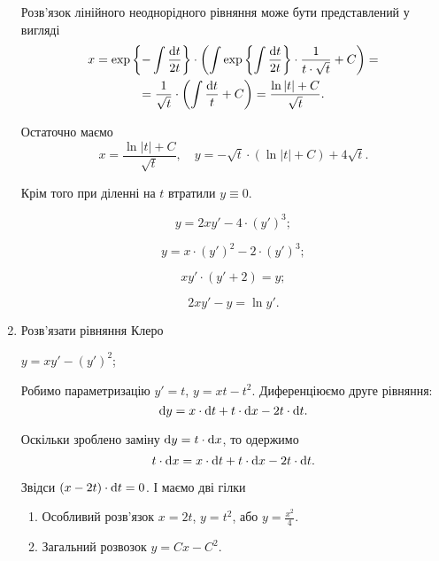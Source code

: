 \begin{enumerate}
\begin{solution}
		Розв'язок лінійного неоднорідного рівняння може бути представлений у вигляді
		\begin{multline*}
			x = \exp\left\{ - \int \frac{\mathop{}\!\mathrm{d} t}{2t} \right\} \cdot \left( \int \exp\left\{\int \frac{\mathop{}\!\mathrm{d} t}{2t} \right\} \cdot \frac{1}{t\cdot\sqrt{t}} + C\right) = \\
			= \frac{1}{\sqrt{t}} \cdot \left(\int \frac {\mathop{}\!\mathrm{d} t}{t} + C\right) = \frac{\ln |t| + C}{\sqrt{t}}.
		\end{multline*}

		Остаточно маємо \[ x = \frac{\ln |t| + C}{\sqrt{t}}, \quad y = - \sqrt{t} \cdot (\ln |t| + C) + 4 \sqrt{t}. \] 

		Крім того при діленні на $t$ втратили $y \equiv 0$.
	\end{solution}

	\begin{multicols}{2}
		\begin{problem}
			\[ y = 2 x y' - 4 \cdot (y')^3;\]
		\end{problem}
	
		\begin{problem}
			\[ y = x \cdot (y')^2 - 2 \cdot (y')^3;\]
		\end{problem}
	
		\begin{problem}
		 	\[ x y' \cdot (y' + 2) = y;\]
		\end{problem}
	
		\begin{problem}
		 	\[ 2 x y' - y = \ln y'.\]
		\end{problem}
	\end{multicols}

	\item Розв'язати рівняння Клеро
	\begin{example}
		$y = x y' - (y')^2$;
	\end{example}
	
	\begin{solution}
		Робимо параметризацію $y' = t$, $y = x t - t^2$. Диференціюємо друге рівняння:
		\[ \mathop{}\!\mathrm{d} y = x \cdot \mathop{}\!\mathrm{d} t + t \cdot \mathop{}\!\mathrm{d} x - 2 t \cdot \mathop{}\!\mathrm{d} t.\]

		Оскільки зроблено заміну $\mathop{}\!\mathrm{d} y = t \cdot \mathop{}\!\mathrm{d} x$, то одержимо
		\[ t \cdot \mathop{}\!\mathrm{d} x = x \cdot \mathop{}\!\mathrm{d} t + t \cdot \mathop{}\!\mathrm{d} x - 2 t \cdot \mathop{}\!\mathrm{d} t.\]

		Звідси $(x - 2t) \cdot \mathop{}\!\mathrm{d} t = 0$. І маємо дві гілки
		\begin{enumerate}
			\item Особливий розв'язок $x = 2t$, $y = t^2$, або $y = \frac{x^2}{4}$.
			\item Загальний розвозок $y = C x - C^2$.
		\end{enumerate}
	\end{solution}


\end{enumerate}
